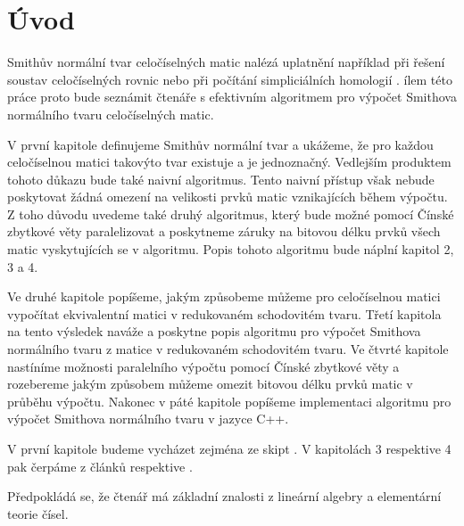 \chapter*{Úvod}

Smithův normální tvar celočíselných matic nalézá uplatnění například při řešení
soustav celočíselných rovnic nebo při počítání simpliciálních homologií \cite{Simplic_Homo}.
ílem této práce proto bude seznámit čtenáře s efektivním
algoritmem pro výpočet Smithova normálního tvaru celočíselných matic.

V první kapitole definujeme Smithův normální tvar a ukážeme, že pro každou
celočíselnou matici takovýto tvar existuje a je jednoznačný. Vedlejším produktem
tohoto důkazu bude také naivní algoritmus.
Tento naivní přístup však nebude poskytovat žádná omezení na velikosti prvků
matic vznikajících během výpočtu. Z toho důvodu uvedeme také druhý algoritmus, který
bude možné pomocí Čínské zbytkové věty paralelizovat a poskytneme záruky na
bitovou délku prvků všech matic vyskytujících se v algoritmu.
Popis tohoto algoritmu bude náplní kapitol 2, 3 a 4.

Ve druhé kapitole popíšeme, jakým způsobeme můžeme pro celočíselnou matici
vypočítat ekvivalentní matici v redukovaném schodovitém tvaru. Třetí kapitola
na tento výsledek naváže a poskytne popis algoritmu pro výpočet Smithova
normálního tvaru z matice v redukovaném schodovitém tvaru. Ve čtvrté kapitole
nastíníme možnosti paralelního výpočtu pomocí Čínské zbytkové věty a rozebereme
jakým způsobem můžeme omezit bitovou délku prvků matic v průběhu výpočtu.
Nakonec v páté kapitole popíšeme implementaci algoritmu pro
výpočet Smithova normálního tvaru v jazyce C++.

V první kapitole budeme vycházet zejména ze skipt \cite{vokr}. V kapitolách
3 respektive 4 pak čerpáme z článků \cite{triang} respektive \cite{SNF_Arne}.

Předpokládá se, že čtenář má základní znalosti z lineární algebry a
elementární teorie čísel.

\cleardoublepage

